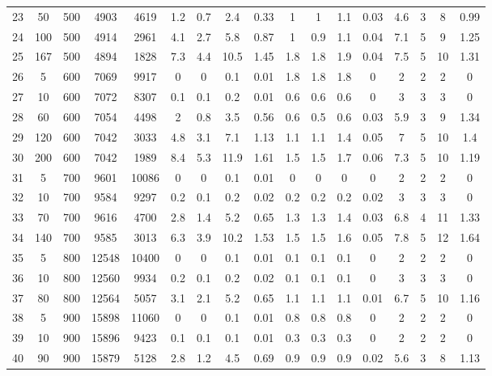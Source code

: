 \documentclass[11pt]{article}
\begin{document}
\begin{landscape}
\begin{longtable}[c]{ccccc|cccc|cccc|cccc}
		\rowcolor[HTML]{EFEFEF} 
		23 & 50 & 500 & 4903 & 4619 & 1.2 & 0.7 & 2.4 & 0.33 & 1 & 1 & 1.1 & 0.03 & 4.6 & 3 & 8 & 0.99 \\
		\rowcolor[HTML]{EFEFEF} 
		24 & 100 & 500 & 4914 & 2961 & 4.1 & 2.7 & 5.8 & 0.87 & 1 & 0.9 & 1.1 & 0.04 & 7.1 & 5 & 9 & 1.25 \\
		\rowcolor[HTML]{EFEFEF} 
		25 & 167 & 500 & 4894 & 1828 & 7.3 & 4.4 & 10.5 & 1.45 & 1.8 & 1.8 & 1.9 & 0.04 & 7.5 & 5 & 10 & 1.31 \\
		26 & 5 & 600 & 7069 & 9917 & 0 & 0 & 0.1 & 0.01 & 1.8 & 1.8 & 1.8 & 0 & 2 & 2 & 2 & 0 \\
		27 & 10 & 600 & 7072 & 8307 & 0.1 & 0.1 & 0.2 & 0.01 & 0.6 & 0.6 & 0.6 & 0 & 3 & 3 & 3 & 0 \\
		28 & 60 & 600 & 7054 & 4498 & 2 & 0.8 & 3.5 & 0.56 & 0.6 & 0.5 & 0.6 & 0.03 & 5.9 & 3 & 9 & 1.34 \\
		29 & 120 & 600 & 7042 & 3033 & 4.8 & 3.1 & 7.1 & 1.13 & 1.1 & 1.1 & 1.4 & 0.05 & 7 & 5 & 10 & 1.4 \\
		30 & 200 & 600 & 7042 & 1989 & 8.4 & 5.3 & 11.9 & 1.61 & 1.5 & 1.5 & 1.7 & 0.06 & 7.3 & 5 & 10 & 1.19 \\
		\rowcolor[HTML]{EFEFEF} 
		31 & 5 & 700 & 9601 & 10086 & 0 & 0 & 0.1 & 0.01 & 0 & 0 & 0 & 0 & 2 & 2 & 2 & 0 \\
		\rowcolor[HTML]{EFEFEF} 
		32 & 10 & 700 & 9584 & 9297 & 0.2 & 0.1 & 0.2 & 0.02 & 0.2 & 0.2 & 0.2 & 0.02 & 3 & 3 & 3 & 0 \\
		\rowcolor[HTML]{EFEFEF} 
		33 & 70 & 700 & 9616 & 4700 & 2.8 & 1.4 & 5.2 & 0.65 & 1.3 & 1.3 & 1.4 & 0.03 & 6.8 & 4 & 11 & 1.33 \\
		\rowcolor[HTML]{EFEFEF} 
		34 & 140 & 700 & 9585 & 3013 & 6.3 & 3.9 & 10.2 & 1.53 & 1.5 & 1.5 & 1.6 & 0.05 & 7.8 & 5 & 12 & 1.64 \\
		35 & 5 & 800 & 12548 & 10400 & 0 & 0 & 0.1 & 0.01 & 0.1 & 0.1 & 0.1 & 0 & 2 & 2 & 2 & 0 \\
		36 & 10 & 800 & 12560 & 9934 & 0.2 & 0.1 & 0.2 & 0.02 & 0.1 & 0.1 & 0.1 & 0 & 3 & 3 & 3 & 0 \\
		37 & 80 & 800 & 12564 & 5057 & 3.1 & 2.1 & 5.2 & 0.65 & 1.1 & 1.1 & 1.1 & 0.01 & 6.7 & 5 & 10 & 1.16 \\
		\rowcolor[HTML]{EFEFEF} 
		38 & 5 & 900 & 15898 & 11060 & 0 & 0 & 0.1 & 0.01 & 0.8 & 0.8 & 0.8 & 0 & 2 & 2 & 2 & 0 \\
		\rowcolor[HTML]{EFEFEF} 
		39 & 10 & 900 & 15896 & 9423 & 0.1 & 0.1 & 0.1 & 0.01 & 0.3 & 0.3 & 0.3 & 0 & 2 & 2 & 2 & 0 \\
		\rowcolor[HTML]{EFEFEF} 
		40 & 90 & 900 & 15879 & 5128 & 2.8 & 1.2 & 4.5 & 0.69 & 0.9 & 0.9 & 0.9 & 0.02 & 5.6 & 3 & 8 & 1.13
	\end{longtable}
\end{landscape}
\end{document}
